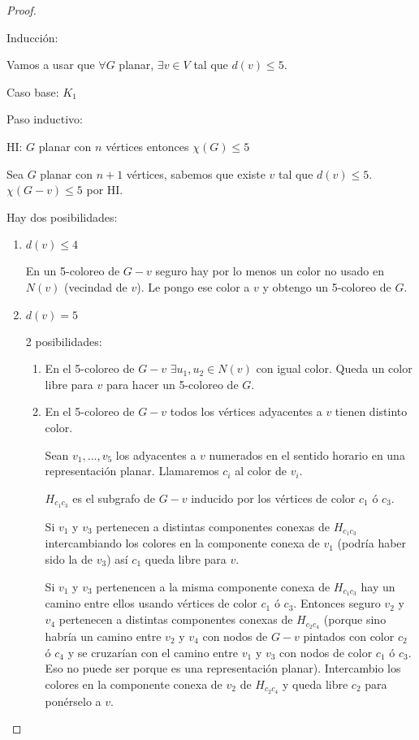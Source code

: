 \begin{proof}
    ~

    Inducción:

    Vamos a usar que $\forall G$ planar, $\exists v \in V $ tal que $d(v) \leq 5$.

    Caso base: $K_1$

    Paso inductivo:

    HI: $G$ planar con $n$ vértices entonces $\chi(G) \leq 5$

    Sea $G$ planar con $n + 1$ vértices, sabemos que existe $v$ tal que $d(v) \leq 5$. $\chi(G - v) \leq 5$ por HI.

    Hay dos posibilidades:
    \begin{enumerate}
        \item $d(v) \leq 4$

        En un 5-coloreo de $G - v$ seguro hay por lo menos un color no usado en $N(v)$ (vecindad de $v$). Le pongo ese color a $v$ y obtengo un 5-coloreo de $G$.

        \item $d(v) = 5$

        2 posibilidades:

        \begin{enumerate}
        \item En el 5-coloreo de $G - v$ $\exists u_1, u_2 \in N(v)$ con igual color. Queda un color libre para $v$ para hacer un 5-coloreo de $G$.

        \item En el 5-coloreo de $G - v$ todos los vértices adyacentes a $v$ tienen distinto color. 

        Sean $v_1, ..., v_5$ los adyacentes a $v$ numerados en el sentido horario en una representación planar. Llamaremos $c_i$ al color de $v_i$.

        $H_{c_1 c_3}$ es el subgrafo de $G - v$ inducido por los vértices de color $c_1$ ó $c_3$. 

        Si $v_1$ y $v_3$ pertenecen a distintas componentes conexas de $H_{c_1 c_3}$ intercambiando los colores en la componente conexa de $v_1$ (podría haber sido la de $v_3$) así $c_1$ queda libre para $v$.

        Si $v_1$ y $v_3$ pertenencen a la misma componente conexa de $H_{c_1 c_3}$ hay un camino entre ellos usando vértices de color $c_1$ ó $c_3$. Entonces seguro $v_2$ y $v_4$ pertenecen a distintas componentes conexas de $H_{c_2 c_4}$ (porque sino habría un camino entre $v_2$ y $v_4$ con nodos de $G - v$ pintados con color $c_2$ ó $c_4$ y se cruzarían con el camino entre $v_1$ y $v_3$ con nodos de color $c_1$ ó $c_3$. Eso no puede ser porque es una representación planar). Intercambio los colores en la componente conexa de $v_2$ de $H_{c_2 c_4}$ y queda libre $c_2$ para ponérselo a $v$.
        \end{enumerate}
    \end{enumerate}
\end{proof}

